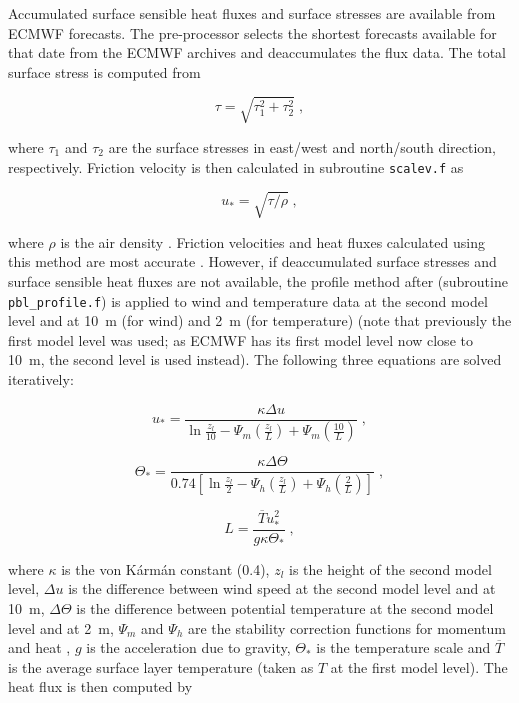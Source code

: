 \documentclass{egu}            %
\begin{document}
\label{PBLparameterization} Accumulated surface sensible heat fluxes and
surface stresses are available from ECMWF forecasts.  The pre-processor selects
the shortest forecasts available for that date from the ECMWF archives and
deaccumulates the flux data.  The total surface stress is computed from

\begin{equation}
\tau=\sqrt{\tau_1^2+\tau_2^2} \;,
\end{equation}

where $\tau_1$ and $\tau_2$ are the surface stresses in east/west and
north/south direction, respectively.  Friction velocity is then calculated in
subroutine \verb|scalev.f| as

\begin{equation}
u_*=\sqrt{\tau/\rho} \;,
\end{equation}

where $\rho$ is the air density \citep{wotawa1996}.  Friction velocities and
heat fluxes calculated using this method are most accurate \citep{wotawa1997}.
However, if deaccumulated surface stresses and surface sensible heat fluxes are
not available, the profile method after \citet{berkowicz1982} (subroutine
\verb|pbl_profile.f|) is applied to wind and temperature data at the second
model level and at 10~m (for wind) and 2~m (for temperature) (note that
previously the first model level was used; as ECMWF has its first model level
now close to 10~m, the second level is used instead).  The following three
equations are solved iteratively:

\begin{equation}
u_*=\frac{\kappa\Delta u}{\ln {\frac{z_l}{10}} -\Psi_m(\frac{z_l}{L}) +\Psi_m(\frac{10}{L})} \; ,
\end{equation}

\begin{equation}
\Theta_*=\frac{\kappa\Delta \Theta}{0.74 \left[{\ln {\frac{z_l}{2}} -\Psi_h(\frac{z_l}{L}) +\Psi_h(\frac{2}{L})}\right]} \; ,
\end{equation}

\begin{equation}
L= \frac{\overline{T}u_*^2}{g \kappa \Theta_*} \;,
\end{equation}

where $\kappa$ is the von K\'{a}rm\'{a}n constant (0.4), $z_l$ is the height of
the second model level, $\Delta u$ is the difference between wind speed at the
second model level and at 10~m, $\Delta \Theta$ is the difference between
potential temperature at the second model level and at 2~m, $\Psi_m$ and
$\Psi_h$ are the stability correction functions for momentum and heat
\citep{businger1971, beljaars1991}, $g$ is the acceleration due to gravity,
$\Theta_*$ is the temperature scale and $\overline{T}$ is the average surface
layer temperature (taken as $T$ at the first model level).  The heat flux is
then computed by
\end{document}
